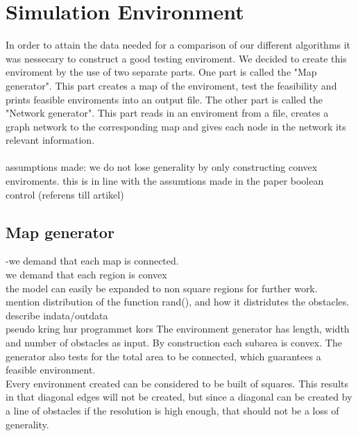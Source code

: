 \chapter{Simulation Environment}
In order to attain the data needed for a comparison of our different algorithms it was nessecary to construct a good testing enviroment. We decided to create this enviroment by the use of two separate parts. One part is called the "Map generator". This part creates a map of the enviroment, test the feasibility and prints feasible enviroments into an output file. The other part is called the "Network generator". This part reads in an enviroment from a file, creates a graph network to the corresponding map and gives each node in the network its relevant information.\\
\\assumptions made: we do not lose generality by only constructing convex enviroments. this is in line with the assumtions made in the paper boolean control (referens till artikel)
\section{Map generator}
-we demand that each map is connected.
\\ we demand that each region is convex
\\the model can easily be expanded to non square regions for further work.
\\mention distribution of the function rand(), and how it distridutes the obstacles.
\\describe indata/outdata
\\pseudo kring hur programmet kors
The environment generator has length, width and number of obstacles as input. By construction each subarea is convex. The generator also tests for the total area to be connected, which guarantees a feasible environment.\\
Every environment created can be considered to be built of squares. This results in that diagonal edges will not be created, but since a diagonal can be created by a line of obstacles if the resolution is high enough, that should not be a loss of generality. \\
